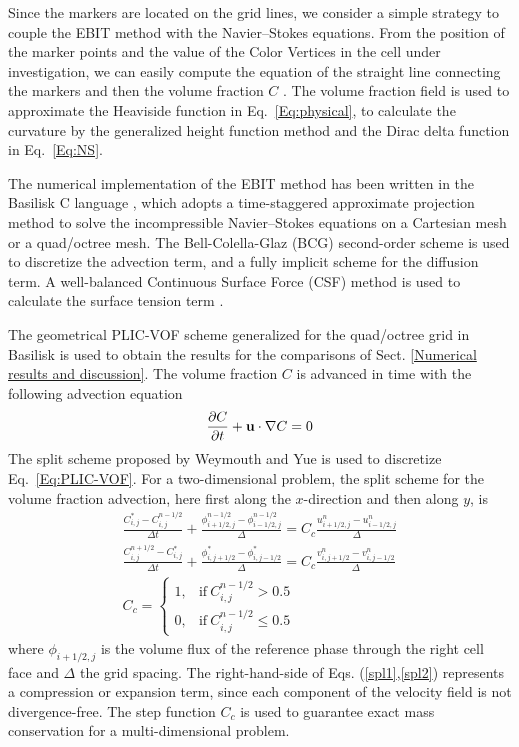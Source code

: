 Since the markers are located on the grid lines, we consider a simple strategy to couple the EBIT method with the Navier--Stokes equations. From the position of the marker points and the value of the Color Vertices in the cell under investigation, we can easily compute the equation of the straight line connecting the markers and then the volume fraction $C$ \cite{Scardovelli00}. The volume fraction field is used to approximate the Heaviside function in Eq.~\eqref{Eq:physical}, to calculate the curvature by the generalized height function method \cite{Popinet_2009_228} and the Dirac delta function in Eq.~\eqref{Eq:NS}.

The numerical implementation of the EBIT method has been written in the Basilisk C language \cite{Popinet_2003_190, Popinet_2009_228}, which adopts a time-staggered approximate projection method to solve the incompressible Navier--Stokes equations on a Cartesian mesh or a quad/octree mesh. 
The Bell-Colella-Glaz (BCG) \cite{Bell_1989_85} second-order scheme is used to discretize the advection term, and a fully implicit scheme for the diffusion term. A well-balanced Continuous Surface Force (CSF) method is used to calculate the surface tension term \cite{Popinet_2009_228, Popinet_2018_50}.

The geometrical PLIC-VOF scheme generalized for the quad/octree grid \cite{Popinet_2009_228} in Basilisk is used to obtain the results for the comparisons of Sect. \ref{Numerical results and discussion}. The volume fraction $C$ is advanced in time with the following advection equation
\begin{gather}
\frac{\partial C}{\partial t} + {\bf u} \cdot \nabla C  = 0
\label{Eq:PLIC-VOF}
\end{gather}
The split scheme proposed by Weymouth and Yue \cite{Weymouth_2010_229} is used to discretize Eq.~\eqref{Eq:PLIC-VOF}. For a two-dimensional problem, the split scheme for the volume fraction advection, here first along the $x$-direction and then along $y$, is
\begin{gather}
\frac{C_{i, j}^ {*} - C_{i, j}^{n-1/2}}{\Delta t} + \frac{\phi_{i + 1/2, j}^{n -1/2} - \phi_{i - 1/2, j}^{n - 1/2}}{\Delta} = C_c \frac{u_{i + 1 / 2, j}^{n} - u_{i - 1 / 2, j}^{n}}{\Delta}
\label{spl1}\\
\frac{C_{i, j}^ {n + 1/2} - C_{i, j}^{*}}{\Delta t} + \frac{\phi_{i, j + 1 / 2}^{*} - \phi_{i, j - 1 / 2}^{*}}{\Delta} = C_c \frac{v_{i, j + 1 / 2}^{n} - v_{i, j - 1 / 2}^{n}}{\Delta}
\label{spl2}\\
C_c = \begin{cases}
      1, & \text{if}\ C_{i, j}^{n - 1 / 2} > 0.5 \\
      0, & \text{if}\ C_{i, j}^{n - 1 / 2} \leq 0.5
\end{cases}
\label{Eq:PLIC-VOF_dis}
\end{gather}
where $\phi_{i + 1/2, j}$ is the volume flux of the reference phase through the right cell face and $\Delta$ the grid spacing. The right-hand-side of Eqs. (\ref{spl1},\ref{spl2}) represents a compression or expansion term, since each component of the velocity field is not divergence-free. The step function $C_c$ is used to guarantee exact mass conservation for a multi-dimensional problem.

